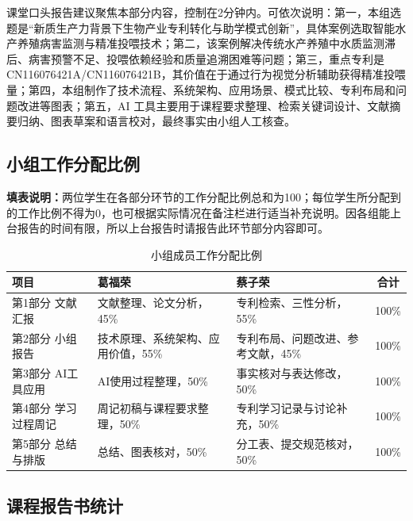 \documentclass[UTF8,zihao=-4]{ctexart}
\begin{document}
	课堂口头报告建议聚焦本部分内容，控制在2分钟内。可依次说明：第一，本组选题是“新质生产力背景下生物产业专利转化与助学模式创新”，具体案例选取智能水产养殖病害监测与精准投喂技术；第二，该案例解决传统水产养殖中水质监测滞后、病害预警不足、投喂依赖经验和质量追溯困难等问题；第三，重点专利是 CN116076421A/CN116076421B，其价值在于通过行为视觉分析辅助获得精准投喂量；第四，本组制作了技术流程、系统架构、应用场景、模式比较、专利布局和问题改进等图表；第五，AI 工具主要用于课程要求整理、检索关键词设计、文献摘要归纳、图表草案和语言校对，最终事实由小组人工核查。
	
	\subsection*{小组工作分配比例}
	
	\noindent\textbf{填表说明：}两位学生在各部分环节的工作分配比例总和为100；每位学生所分配到的工作比例不得为0，也可根据实际情况在备注栏进行适当补充说明。因各组能上台报告的时间有限，所以上台报告时请报告此环节部分内容即可。
	
	\begin{table}[H]
		\centering
		\caption{小组成员工作分配比例}
		\begin{tabularx}{\textwidth}{lXXc}
			\toprule
			项目 & 葛福荣 & 蔡子荣 & 合计 \\
			\midrule
			第1部分 文献汇报 & 文献整理、论文分析，45\% & 专利检索、三性分析，55\% & 100\% \\
			第2部分 小组报告 & 技术原理、系统架构、应用价值，55\% & 专利布局、问题改进、参考文献，45\% & 100\% \\
			第3部分 AI工具应用 & AI使用过程整理，50\% & 事实核对与表达修改，50\% & 100\% \\
			第4部分 学习过程周记 & 周记初稿与课程要求整理，50\% & 专利学习记录与讨论补充，50\% & 100\% \\
			第5部分 总结与排版 & 总结、图表核对，50\% & 分工表、提交规范核对，50\% & 100\% \\
			\bottomrule
		\end{tabularx}
	\end{table}
	
	\subsection*{课程报告书统计}
	
\end{document}
